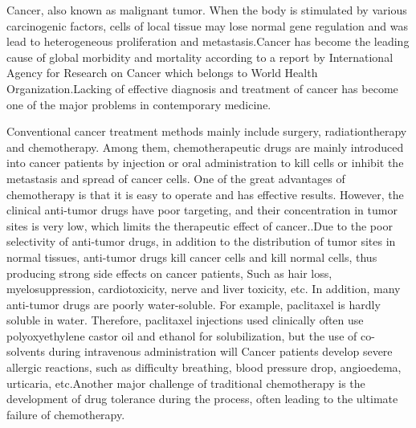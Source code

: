 \documentclass[10pt]{article}
\begin{document}
\begin{flushleft}
Cancer, also known as malignant tumor. When the body is stimulated by various carcinogenic factors, cells of local tissue may lose normal gene regulation and was lead to heterogeneous proliferation and metastasis.Cancer has become the leading cause of global morbidity and mortality according to a report\citep*{torre2015global} by International Agency for Research on Cancer which belongs to World Health Organization.Lacking of effective diagnosis and treatment of cancer has become one of the major problems in contemporary medicine.
\par
Conventional cancer treatment methods mainly include surgery, radiationtherapy and chemotherapy\citep*{peer2007nanocarriers}. Among them, chemotherapeutic drugs are mainly introduced into cancer patients by injection or oral administration to kill cells or inhibit the metastasis and spread of cancer cells. One of the great advantages of chemotherapy is that it is easy to operate and has effective results. However, the clinical anti-tumor drugs have poor targeting, and their concentration in tumor sites is very low, which limits the therapeutic effect of cancer.\citep*{parhi2012nanotechnology,wicki2015nanomedicine}.Due to the poor selectivity of anti-tumor drugs, in addition to the distribution of tumor sites in normal tissues, anti-tumor drugs kill cancer cells and kill normal cells, thus producing strong side effects on cancer patients, Such as hair loss, myelosuppression, cardiotoxicity, nerve and liver toxicity, etc.\citep*{priestman2008some} In addition, many anti-tumor drugs are poorly water-soluble. For example, paclitaxel is hardly soluble in water. Therefore, paclitaxel injections used clinically often use polyoxyethylene castor oil and ethanol for solubilization, but the use of co-solvents during intravenous administration will Cancer patients develop severe allergic reactions\citep*{micha2006abraxane}, such as difficulty breathing, blood pressure drop, angioedema, urticaria, etc.Another major challenge of traditional chemotherapy is the development of drug tolerance during the process, often leading to the ultimate failure of chemotherapy.
\par

\end{flushleft}
\end{document}
